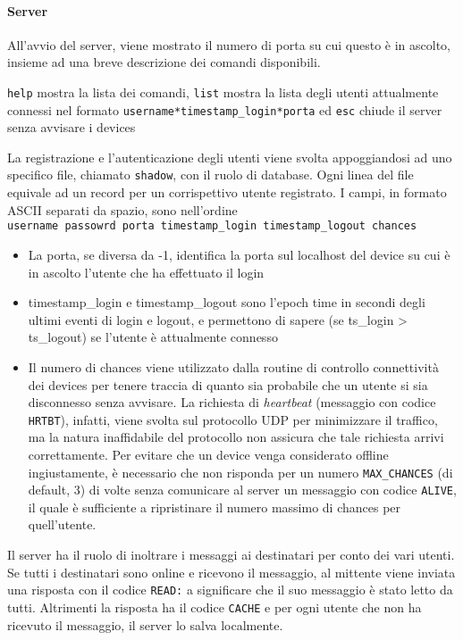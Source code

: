 \documentclass[11pt,a4paper,twocolumn,twoside]{paper}
\begin{document}
\paragraph{Server}
 All'avvio del server, viene mostrato il numero di porta su cui
    questo è in ascolto, insieme ad una breve descrizione dei comandi
    disponibili.

    \texttt{help} mostra la lista dei comandi, \texttt{list} mostra la
    lista degli utenti attualmente connessi nel formato
    \texttt{username*timestamp\_login*porta} ed \texttt{esc} chiude il
    server senza avvisare i devices

    La registrazione e l'autenticazione degli utenti viene svolta
    appoggiandosi ad uno specifico file, chiamato \texttt{shadow}, con
    il ruolo di database. Ogni linea del file equivale ad un record per
    un corrispettivo utente registrato. I campi, in formato ASCII
    separati da spazio, sono nell'ordine
    \texttt{username\ passowrd\ porta\ timestamp\_login\ timestamp\_logout\ chances}
\begin{itemize}[leftmargin=4mm, noitemsep]


	\item La porta, se diversa da -1, identifica la porta sul localhost del
      device su cui è in ascolto l'utente che ha effettuato il login

      \item timestamp\_login e timestamp\_logout sono l'epoch time in
      secondi degli ultimi eventi di login e logout, e permettono di
      sapere (se ts\_login \textgreater{} ts\_logout) se l'utente è
      attualmente connesso

      \item Il numero di chances viene utilizzato dalla routine di controllo
      connettività dei devices per tenere traccia di quanto sia
      probabile che un utente si sia disconnesso senza avvisare. La
      richiesta di \emph{heartbeat} (messaggio con codice
      \texttt{HRTBT}), infatti, viene svolta sul protocollo UDP per
      minimizzare il traffico, ma la natura inaffidabile del protocollo
      non assicura che tale richiesta arrivi correttamente. Per evitare
      che un device venga considerato offline ingiustamente, è
      necessario che non risponda per un numero \texttt{MAX\_CHANCES}
      (di default, 3) di volte senza comunicare al server un messaggio
      con codice \texttt{ALIVE}, il quale è sufficiente a ripristinare
      il numero massimo di chances per quell'utente.
\end{itemize}
    Il server ha il ruolo di inoltrare i messaggi ai destinatari per
    conto dei vari utenti. Se tutti i destinatari sono online e ricevono
    il messaggio, al mittente viene inviata una risposta con il codice
    \texttt{READ:} a significare che il suo messaggio è stato
    letto da tutti. Altrimenti la risposta ha il codice \texttt{CACHE} e
    per ogni utente che non ha ricevuto il messaggio, il server lo salva
    localmente. 
    
\end{document}

